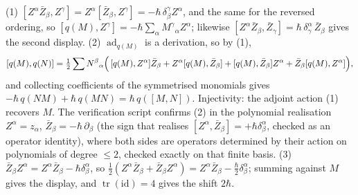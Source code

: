 (1) $[Z^\alpha\bar Z_\beta, Z^\gamma] = Z^\alpha[\bar Z_\beta, Z^\gamma] = -\hbar\,\delta^\gamma_\beta Z^\alpha$, and the same for the reversed ordering, so $[q(M), Z^\gamma] = -\hbar\sum_\alpha M^\gamma{}_\alpha Z^\alpha$; likewise $[Z^\alpha \bar Z_\beta, \bar Z_\gamma] = \hbar\,\delta^\alpha_\gamma\,\bar Z_\beta$ gives the second display.
(2) $\operatorname{ad}_{q(M)}$ is a derivation, so by (1),
\[
[q(M), q(N)] = \tfrac12\sum N^\beta{}_\alpha\Bigl(\,[q(M),Z^\alpha]\bar Z_\beta + Z^\alpha[q(M),\bar Z_\beta] + [q(M),\bar Z_\beta]Z^\alpha + \bar Z_\beta[q(M),Z^\alpha]\Bigr),
\]
and collecting coefficients of the symmetrised monomials gives $-\hbar\,q(NM) + \hbar\,q(MN) = \hbar\,q([M,N])$. Injectivity: the adjoint action (1) recovers $M$. The verification script confirms (2) in the polynomial realisation $Z^\alpha = z_\alpha$, $\bar Z_\beta = -\hbar\,\partial_\beta$ (the sign that realises $[Z^\alpha, \bar Z_\beta] = +\hbar\delta^\alpha_\beta$, checked as an operator identity), where both sides are operators determined by their action on polynomials of degree $\le 2$, checked exactly on that finite basis.
(3) $\bar Z_\beta Z^\alpha = Z^\alpha \bar Z_\beta - \hbar\delta^\alpha_\beta$, so $\tfrac12(Z^\alpha\bar Z_\beta + \bar Z_\beta Z^\alpha) = Z^\alpha\bar Z_\beta - \tfrac{\hbar}{2}\delta^\alpha_\beta$; summing against $M$ gives the display, and $\operatorname{tr}(\mathrm{id}) = 4$ gives the shift $2\hbar$.
